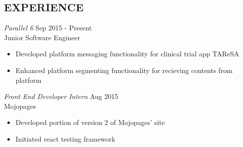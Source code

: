 \documentclass[margin]{res}
\begin{document}
\begin{resume}

\section{EXPERIENCE} 

   {\sl Parallel 6} \hfill Sep 2015 - Present \\
   Junior Software Engineer
   \begin{itemize}  \itemsep -2pt %
     \item Developed platform messaging functionality for clinical trial app TAReSA
     \item Enhanced platform segmenting functionality for recieving contents from platform
   \end{itemize}

  {\sl Front End Developer Intern} \hfill Aug 2015 \\
  Mojopages
  \begin{itemize}
      \item Developed portion of version 2 of Mojopages’ site
      \item Initiated react testing framework
  \end{itemize}


\end{resume}
\end{document}
